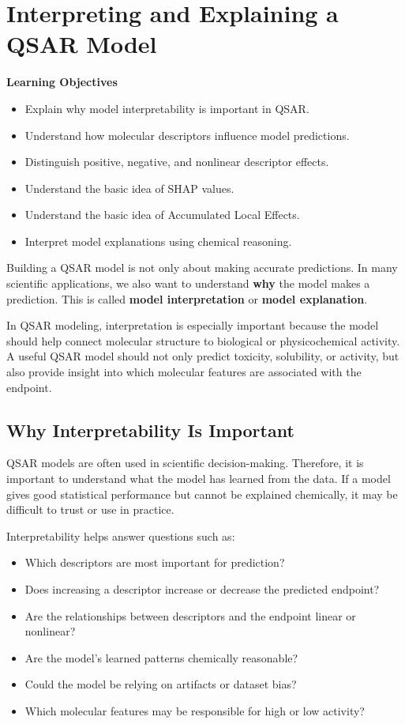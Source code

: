 \documentclass[11pt]{report}
\newenvironment{Important note}{\begin{quote}\color{red}\textbf{Important note:} }{\end{quote}}
\newenvironment{learningobjectives}
{\vspace{0.5em}\noindent\textbf{Learning Objectives}\begin{itemize}[leftmargin=*]}
{\end{itemize}\vspace{0.5em}}
\begin{document}
\chapter{Interpreting and Explaining a QSAR Model}

\begin{learningobjectives}
    \item Explain why model interpretability is important in QSAR.
    \item Understand how molecular descriptors influence model predictions.
    \item Distinguish positive, negative, and nonlinear descriptor effects.
    \item Understand the basic idea of SHAP values.
    \item Understand the basic idea of Accumulated Local Effects.
    \item Interpret model explanations using chemical reasoning.
\end{learningobjectives}

Building a QSAR model is not only about making accurate predictions. In many scientific applications, we also want to understand \textbf{why} the model makes a prediction. This is called \textbf{model interpretation} or \textbf{model explanation}.

In QSAR modeling, interpretation is especially important because the model should help connect molecular structure to biological or physicochemical activity. A useful QSAR model should not only predict toxicity, solubility, or activity, but also provide insight into which molecular features are associated with the endpoint.

\section{Why Interpretability Is Important}

QSAR models are often used in scientific decision-making. Therefore, it is important to understand what the model has learned from the data. If a model gives good statistical performance but cannot be explained chemically, it may be difficult to trust or use in practice.

Interpretability helps answer questions such as:

\begin{itemize}[leftmargin=*]
    \item Which descriptors are most important for prediction?
    \item Does increasing a descriptor increase or decrease the predicted endpoint?
    \item Are the relationships between descriptors and the endpoint linear or nonlinear?
    \item Are the model's learned patterns chemically reasonable?
    \item Could the model be relying on artifacts or dataset bias?
    \item Which molecular features may be responsible for high or low activity?
\end{itemize}
\end{document}
